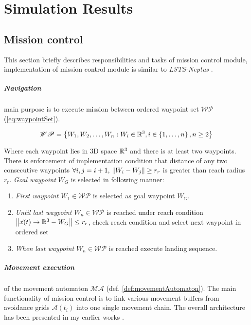 \chapter{Simulation Results}\label{ch:06SimulationResults}
\section{Mission control}
\noindent This section briefly describes responsibilities and tasks of mission control module, implementation of mission control module is similar to \emph{LSTS-Neptus} \cite{dias2006mission,dias2005neptus}.

\paragraph{Navigation} main purpose is to execute mission between  ordered waypoint set $\mathscr{WP}$ (\ref{eq:waypointSet}). 

\begin{equation}\label{eq:waypointSet}
    \mathscr{WP}=\left\{W_1,W_2,\dots,W_n:W_i\in\mathbb{R}^3, i\in \left\{1,\dots,n\right\},n\ge 2\right\}
\end{equation}

\noindent Where each waypoint lies in 3D space $\mathbb{R}^3$ and there is at least two waypoints. There is enforcement of implementation condition that distance of any two consecutive waypoints $\forall i,j=i+1,\, \left\lVert W_i - W_j\right\rVert\ge r_r$ is greater than reach radius $r_r$. \emph{Goal waypoint} $W_G$ is selected in following manner:
\begin{enumerate}
    \item\emph{First waypoint $W_1\in\mathscr{WP}$} is selected as goal waypoint $W_G$.
    \item\emph{Until last waypoint $W_n\in\mathscr{WP}$} is reached under reach condition $\left\lVert\vec{x}(t)\to\mathbb{R}^3-W_G\right\rVert\le r_r$, check reach condition and select next waypoint in ordered set
    \item\emph{When last waypoint $W_n\in\mathscr{WP}$} is reached execute landing sequence. 
\end{enumerate}

\paragraph{Movement execution} of the movement automaton $\mathscr{MA}$ (def. \ref{def:movementAutomaton}). The main functionality of mission control is to link various movement buffers from avoidance grids $\mathscr{A}(t_i)$ into one single movement chain. The overall architecture has been presented in my earlier works \cite{alojzgomola2017}. 

